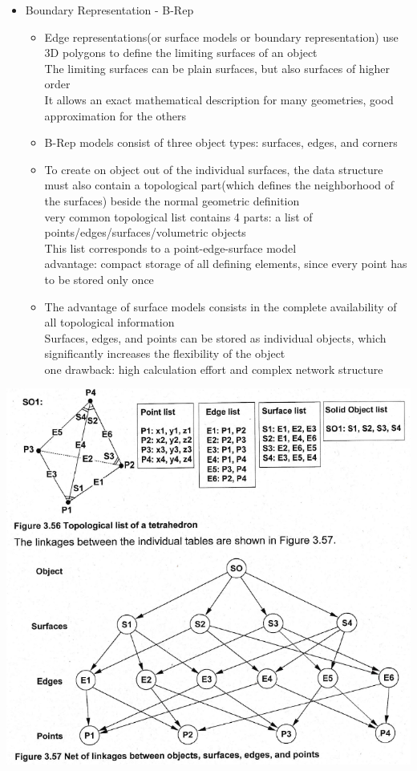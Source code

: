 \documentclass[12pt]{article}
\begin{document}
\begin{itemize}
	\item Boundary Representation - B-Rep
	\begin{itemize}
		\item Edge representations(or surface models or boundary representation) use 3D polygons to define the limiting surfaces of an object \\
		The limiting surfaces can be plain surfaces, but also surfaces of higher order \\
		It allows an exact mathematical description for many geometries, good approximation for the others
		\item B-Rep models consist of three object types: surfaces, edges, and corners
		\item To create on object out of the individual surfaces, the data structure must also contain a topological part(which defines the neighborhood of the surfaces) beside the normal geometric definition \\
		very common topological list contains 4 parts: a list of points/edges/surfaces/volumetric objects \\
		This list corresponds to a point-edge-surface model \\
		advantage: compact storage of all defining elements, since every point has to be stored only once
		\item The advantage of surface models consists in the complete availability of all topological information \\
		Surfaces, edges, and points can be stored as individual objects, which significantly increases the flexibility of the object \\
		one drawback: high calculation effort and complex network structure
	\end{itemize}
\end{itemize}

\includegraphics[scale=0.7]{3_56}
\end{document}
